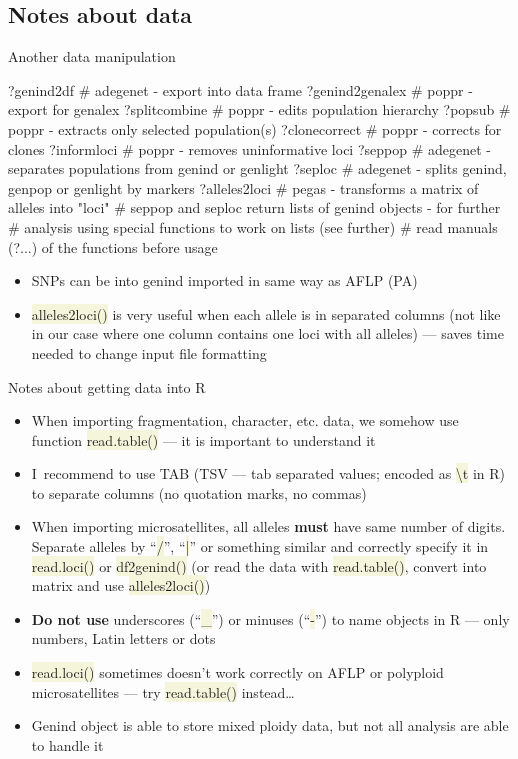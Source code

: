 \documentclass[compress, ucs, xelatex, 11pt, xcolor=svgnames, aspectratio=169,
	hyperref={
		bookmarks=true,
		unicode=true,
		colorlinks=true,
		pdftitle={Molecular data in R},
		plainpages=false,
		pdfauthor={Vojtech Zeisek},
		pdfsubject={Course about phylogeny and evolution in R},
		pdfcreator={XeLaTeX},
		pdfkeywords={R, evolution, phylogeny, molecular data},
		linkcolor=Crimson, %
		anchorcolor=Magenta, %
		citecolor=Magenta, %
		filecolor=Magenta, %
		menucolor=Magenta, %
		urlcolor=DodgerBlue, %
		pdftex},
	url={hyphens, lowtilde} %
	]{beamer}
\renewcommand{\texttt}[1]{\colorbox{Beige}{{\ttfamily #1}}}
\begin{document}
\subsection{Notes about data}

\begin{frame}[fragile]{Another data manipulation}
	\begin{spluscode}
    ?genind2df # adegenet - export into data frame
    ?genind2genalex # poppr - export for genalex
    ?splitcombine # poppr - edits population hierarchy
    ?popsub # poppr - extracts only selected population(s)
    ?clonecorrect # poppr - corrects for clones
    ?informloci # poppr - removes uninformative loci
    ?seppop # adegenet - separates populations from genind or genlight
    ?seploc # adegenet - splits genind, genpop or genlight by markers
    ?alleles2loci # pegas - transforms a matrix of alleles into "loci"
    # seppop and seploc return lists of genind objects - for further
    # analysis using special functions to work on lists (see further)
    # read manuals (?...) of the functions before usage
	\end{spluscode}
	\begin{itemize}
		\item SNPs can be into genind imported in same way as AFLP (PA)
		\item \texttt{alleles2loci()} is very useful when each allele is in separated columns (not like in our case where one column contains one loci with all alleles) --- saves time needed to change input file formatting
	\end{itemize}
\end{frame}

\begin{frame}{Notes about getting data into R}
	\begin{itemize}
		\item When importing fragmentation, character, etc. data, we somehow use function \texttt{read.table()} --- it is important to understand it
		\item I~recommend to use TAB (TSV --- tab separated values; encoded as \texttt{\textbackslash t} in R) to separate columns (no quotation marks, no commas)
		\item When importing microsatellites, all alleles \textbf{must} have same number of digits. Separate alleles by \enquote{\texttt{/}}, \enquote{\texttt{|}} or something similar and correctly specify it in \texttt{read.loci()} or \texttt{df2genind()} (or read the data with \texttt{read.table()}, convert into matrix and use \texttt{alleles2loci()})
		\item \textbf{Do not use} underscores (\enquote{\texttt{\_}}) or minuses (\enquote{\texttt{-}}) to name objects in R --- only numbers, Latin letters or dots
		\item \texttt{read.loci()} sometimes doesn't work correctly on AFLP or polyploid microsatellites --- try \texttt{read.table()} instead\ldots
		\item Genind object is able to store mixed ploidy data, but not all analysis are able to handle it
	\end{itemize}
\end{frame}
\end{document}
